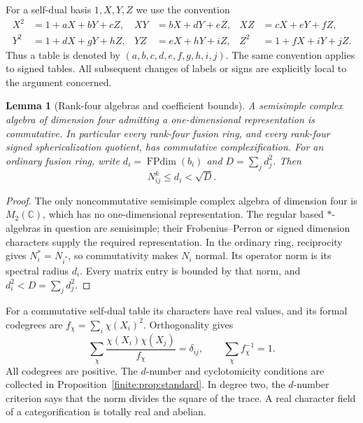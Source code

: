 \documentclass[11pt,a4paper]{article}
\newtheorem{lemma}[theorem]{Lemma}
\theoremstyle{definition}\newtheorem{definition}[theorem]{Definition}
\theoremstyle{remark}\newtheorem{remark}[theorem]{Remark}
\DeclareMathOperator{\FPdim}{FPdim}
\newcommand{\CC}{\mathbb C}
\numberwithin{equation}{section}
\begin{document}
For a self-dual basis $1,X,Y,Z$ we use the convention
\begin{equation}\label{eq:tuple-convention}
\begin{aligned}
X^2&=1+aX+bY+cZ,&XY&=bX+dY+eZ,&XZ&=cX+eY+fZ,\\
Y^2&=1+dX+gY+hZ,&YZ&=eX+hY+iZ,&Z^2&=1+fX+iY+jZ.
\end{aligned}
\end{equation}
Thus a table is denoted by $(a,b,c,d,e,f,g,h,i,j)$.
The same convention applies to signed tables. All subsequent changes
of labels or signs are explicitly local to the argument concerned.

\begin{lemma}[Rank-four algebras and coefficient bounds]
\label{core:lem:rank-four-algebra}\label{core:lem:coefficient-bound}
A semisimple complex algebra of dimension four admitting a
one-dimensional representation is commutative. In particular every
rank-four fusion ring, and every rank-four signed sphericalization
quotient, has commutative complexification. For an ordinary fusion ring,
write $d_i=\FPdim(b_i)$ and $D=\sum_jd_j^2$. Then
\[
 N_{ij}^{k}\le d_i<\sqrt D.
\]
\end{lemma}
\begin{proof}
The only noncommutative semisimple complex algebra of dimension four
is $M_2(\CC)$, which has no one-dimensional representation.
The regular based $*$-algebras in question are semisimple; their
Frobenius--Perron or signed dimension characters supply the required
representation. In the ordinary ring, reciprocity gives
$N_i^*=N_{i^*}$, so commutativity makes $N_i$ normal. Its operator norm
is its spectral radius $d_i$. Every matrix entry is bounded by that
norm, and $d_i^2<D=\sum_jd_j^2$.
\end{proof}

For a commutative self-dual table its characters have real values,
and its formal codegrees are
$f_\chi=\sum_i\chi(X_i)^2$. Orthogonality gives
\begin{equation}\label{core:orthog}
\sum_\chi\frac{\chi(X_i)\chi(X_j)}{f_\chi}=\delta_{ij},
\qquad\sum_\chi f_\chi^{-1}=1.
\end{equation}
All codegrees are positive. The $d$-number and cyclotomicity conditions
are collected in Proposition~\ref{finite:prop:standard}. In degree two,
the $d$-number criterion says that the norm divides the square of the
trace. A real character field of a categorification is totally real
and abelian.
\end{document}
